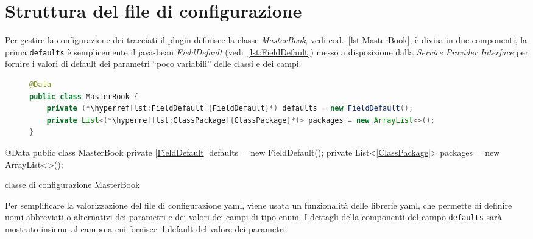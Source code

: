 \section{Struttura del file di configurazione}
Per gestire la configurazione dei tracciati il plugin definisce la classe
\textsl{MasterBook}, vedi cod.~\ref{lst:MasterBook}, è divisa in due componenti,
la prima \texttt{defaults} è semplicemente il java-bean \textsl{FieldDefault}
(vedi~\ref{lst:FieldDefault}) messo a disposizione dalla 
\textsl{Service Provider Interface} per fornire i valori di default dei 
parametri ``poco variabili'' delle classi e dei campi.

\ifesource
\begin{figure*}[!htb]
\begin{lstlisting}[language=java, caption=classe di configurazione MasterBook, 
label=lst:MasterBook]
@Data
public class MasterBook {
    private (*\hyperref[lst:FieldDefault]{FieldDefault}*) defaults = new FieldDefault();
    private List<(*\hyperref[lst:ClassPackage]{ClassPackage}*)> packages = new ArrayList<>();
}
\end{lstlisting}
\end{figure*}
\else
\begin{elisting}[!htb]
\begin{javacode}
@Data
public class MasterBook {
    private |\hyperref[lst:FieldDefault]{FieldDefault}| defaults = new FieldDefault();
    private List<|\hyperref[lst:ClassPackage]{ClassPackage}|> packages = new ArrayList<>();
}
\end{javacode}
\caption{classe di configurazione MasterBook}
\label{lst:MasterBook}
\end{elisting}
\fi

Per semplificare la valorizzazione del file di configurazione yaml, viene usata
un funzionalità delle librerie yaml, che permette di definire nomi abbreviati o
alternativi dei parametri e dei valori dei campi di tipo enum.
I dettagli della componenti del campo \texttt{defaults} sarà mostrato insieme al
campo a cui fornisce il default del valore dei parametri.


